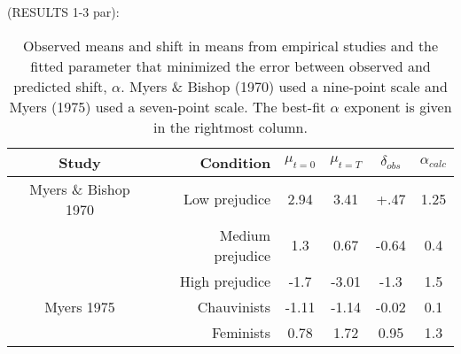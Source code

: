 \documentclass[a4paper,12pt]{article}
\begin{document}


(RESULTS 1-3 par): 

\begin{table}
  \centering
  \caption{Observed means and shift in means from empirical studies and the
  fitted parameter that minimized the error between observed and predicted
  shift, $\alpha$. Myers \& Bishop (1970) used a nine-point scale and 
  Myers (1975) used a seven-point scale. The best-fit $\alpha$ exponent is given
  in the rightmost column.}
  \label{tab:results}
  \vspace{0.5em}
  \begin{tabular}{crcccc}
    Study     & Condition     & $\mu_{t=0}$ & $\mu_{t=T}$ & $\delta_{obs}$ & $\alpha_{calc}$ \\
    \toprule
    Myers \& Bishop 1970 & Low prejudice & 2.94 & 3.41 & +.47 & 1.25 \\
                         & Medium prejudice & 1.3 & 0.67 & -0.64 & 0.4 \\
                         & High prejudice & -1.7 & -3.01 & -1.3 & 1.5 \\
                         \midrule
    Myers 1975 & Chauvinists & -1.11 & -1.14 & -0.02 & 0.1 \\
               & Feminists & 0.78 & 1.72 & 0.95 & 1.3 \\
               \bottomrule
  \end{tabular}
\end{table}
\end{document}
